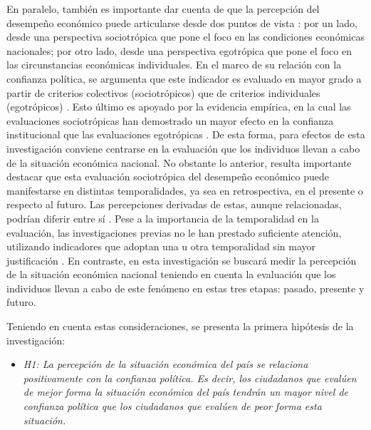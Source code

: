 \documentclass[12pt,twoside]{templates/facsothesis}
\providecommand{\tightlist}{%
  \setlength{\itemsep}{0pt}\setlength{\parskip}{0pt}}
\begin{document}
En paralelo, también es importante dar cuenta de que la percepción del desempeño económico puede articularse desde dos puntos de vista \citep{vandermeerEconomicPerformancePolitical2018}: por un lado, desde una perspectiva sociotrópica que pone el foco en las condiciones económicas nacionales; por otro lado, desde una perspectiva egotrópica que pone el foco en las circunstancias económicas individuales. En el marco de su relación con la confianza política, se argumenta que este indicador es evaluado en mayor grado a partir de criterios colectivos (sociotrópicos) que de criterios individuales (egotrópicos) \citep{mcallisterEconomicPerformanceGovernments1999}. Esto último es apoyado por la evidencia empírica, en la cual las evaluaciones sociotrópicas han demostrado un mayor efecto en la confianza institucional que las evaluaciones egotrópicas \citep{mainwaringStateDeficienciesParty2006, torcalDeclinePoliticalTrust2014a, torcalResponsivenessPerformanceCorruption2021, vandermeerEconomicPerformancePolitical2018}. De esta forma, para efectos de esta investigación conviene centrarse en la evaluación que los individuos llevan a cabo de la situación económica nacional. No obstante lo anterior, resulta importante destacar que esta evaluación sociotrópica del desempeño económico puede manifestarse en distintas temporalidades, ya sea en retrospectiva, en el presente o respecto al futuro. Las percepciones derivadas de estas, aunque relacionadas, podrían diferir entre sí \citep{torcalResponsivenessPerformanceCorruption2021}. Pese a la importancia de la temporalidad en la evaluación, las investigaciones previas no le han prestado suficiente atención, utilizando indicadores que adoptan una u otra temporalidad sin mayor justificación \citep{mainwaringStateDeficienciesParty2006, leeEconomicPerformanceIncome2020, oskarssonGeneralizedTrustPolitical2010} . En contraste, en esta investigación se buscará medir la percepción de la situación económica nacional teniendo en cuenta la evaluación que los individuos llevan a cabo de este fenómeno en estas tres etapas: pasado, presente y futuro.

Teniendo en cuenta estas consideraciones, se presenta la primera hipótesis de la investigación:

\begin{itemize}
\tightlist
\item
  \emph{H1: La percepción de la situación económica del país se relaciona positivamente con la confianza política. Es decir, los ciudadanos que evalúen de mejor forma la situación económica del país tendrán un mayor nivel de confianza política que los ciudadanos que evalúen de peor forma esta situación.}
\end{itemize}
\end{document}
